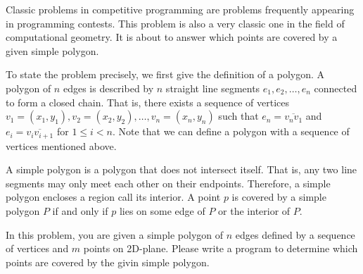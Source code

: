 Classic problems in competitive programming are problems frequently appearing
in programming contests. This problem is also a very classic one in the field
of computational geometry. It is about to answer which points are covered by 
a given simple polygon.

To state the problem precisely, we first give the definition of a polygon.
A polygon of $n$ edges is described by $n$ straight line segments
$e_1,e_2,\dots,e_n$ connected to form a closed chain. That is, there exists
a sequence of vertices $v_1=(x_1,y_1),v_2=(x_2,y_2),\dots,v_n=(x_n,y_n)$ such
that $e_n=\overline{v_nv_1}$ and $e_i=\overline{v_iv_{i+1}}$ for $1\le i< n$.
Note that we can define a polygon with a sequence of vertices mentioned above.

A simple polygon is a polygon that does not intersect itself. 
That is, any two line segments may only meet each other on their endpoints.
Therefore, a simple polygon encloses a region call its interior.
A point $p$ is covered by a simple polygon $P$ if and only if $p$ lies on some
edge of $P$ or the interior of $P$.

In this problem, you are given a simple polygon of $n$ edges defined 
by a sequence of vertices and $m$ points on 2D-plane. Please write a program
to determine which points are covered by the givin simple polygon.

